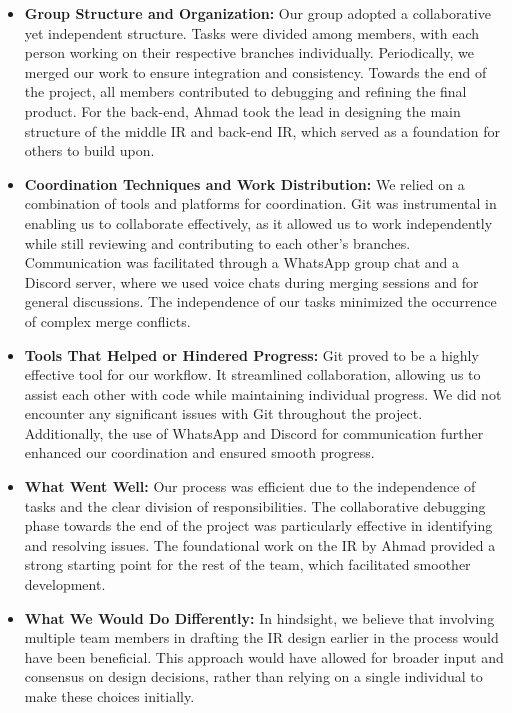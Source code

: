 \documentclass[11pt,a4paper]{article}
\begin{document}
\begin{itemize}[leftmargin=*]
  \item \textbf{Group Structure and Organization:}
  Our group adopted a collaborative yet independent structure. Tasks were divided among members, with each person working on their respective branches individually. Periodically, we merged our work to ensure integration and consistency. Towards the end of the project, all members contributed to debugging and refining the final product. For the back-end, Ahmad took the lead in designing the main structure of the middle IR and back-end IR, which served as a foundation for others to build upon.

  \item \textbf{Coordination Techniques and Work Distribution:}
  We relied on a combination of tools and platforms for coordination. Git was instrumental in enabling us to collaborate effectively, as it allowed us to work independently while still reviewing and contributing to each other's branches. Communication was facilitated through a WhatsApp group chat and a Discord server, where we used voice chats during merging sessions and for general discussions. The independence of our tasks minimized the occurrence of complex merge conflicts.

  \item \textbf{Tools That Helped or Hindered Progress:}
  Git proved to be a highly effective tool for our workflow. It streamlined collaboration, allowing us to assist each other with code while maintaining individual progress. We did not encounter any significant issues with Git throughout the project. Additionally, the use of WhatsApp and Discord for communication further enhanced our coordination and ensured smooth progress.

  \item \textbf{What Went Well:}
  Our process was efficient due to the independence of tasks and the clear division of responsibilities. The collaborative debugging phase towards the end of the project was particularly effective in identifying and resolving issues. The foundational work on the IR by Ahmad provided a strong starting point for the rest of the team, which facilitated smoother development.

  \item \textbf{What We Would Do Differently:}
  In hindsight, we believe that involving multiple team members in drafting the IR design earlier in the process would have been beneficial. This approach would have allowed for broader input and consensus on design decisions, rather than relying on a single individual to make these choices initially.
\end{itemize}
\end{document}
